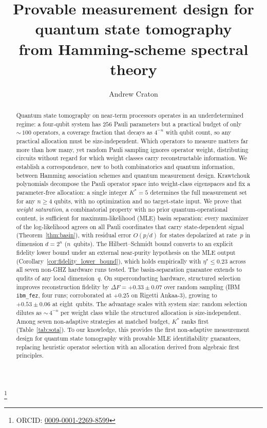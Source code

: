 \documentclass[twocolumn,prx,aps,superscriptaddress,longbibliography,floatfix]{revtex4-2}
\newcommand{\pclaim}[4]{}
\begin{document}
\title{Provable measurement design for quantum state tomography\\
from Hamming-scheme spectral theory}

\author{Andrew Craton}
\thanks{ORCID: \href{https://orcid.org/0009-0001-2269-8599}{0009-0001-2269-8599}}

\begin{abstract}
Quantum state tomography on near-term processors operates in an
underdetermined regime: a four-qubit system has $256$ Pauli
parameters but a practical budget of only ${\sim}\,100$
operators, a coverage fraction that decays as $4^{-n}$ with
qubit count, so any practical allocation must be
size-independent.
Which operators to measure matters far more than how many, yet
random Pauli sampling ignores operator weight, distributing
circuits without regard for which weight classes carry
reconstructable information.
%
We establish a correspondence, new to both combinatorics and
quantum information, between Hamming association schemes and
quantum measurement design.
\pclaim{prose:abstract:basin}{proved}{*}{thm:basin}%
Krawtchouk polynomials decompose the Pauli operator space into
weight-class eigenspaces and fix a parameter-free allocation:
a single integer $K^* = 5$ determines the full measurement
set for any $n \ge 4$ qubits, with no optimization and no
target-state input.
We prove that \emph{weight saturation}, a combinatorial
property with no prior quantum-operational content, is
sufficient for maximum-likelihood (MLE) basin separation:
every maximizer of the log-likelihood agrees on all
Pauli coordinates that carry state-dependent signal
(Theorem~\ref{thm:basin}),
with residual error $O(p/d)$ for states depolarized at
rate~$p$ in dimension $d = 2^n$ ($n$~qubits).
The Hilbert--Schmidt bound converts to an explicit fidelity
lower bound under an external near-purity hypothesis on the
MLE output (Corollary~\ref{cor:fidelity_lower_bound}), which
holds empirically with $\eta^{\star} \le 0.23$ across all
seven non-GHZ hardware runs tested.
The basin-separation guarantee extends to qudits of any local dimension~$q$.
\pclaim{prose:abstract:iff}{proved}{*}{lem:spectral_q_main}%
%
On superconducting hardware, structured selection improves
reconstruction fidelity by $\Delta F = +0.33 \pm 0.07$ over
random sampling (IBM \texttt{ibm\_fez}, four runs; corroborated
at $+0.25$ on Rigetti Ankaa-3), growing to
$+0.53 \pm 0.06$ at eight~qubits.
The advantage scales with system size: random selection
dilutes as ${\sim}\,4^{-n}$ per weight class while the
structured allocation is size-independent.
Among seven non-adaptive strategies at matched budget, $K^*$
ranks first (Table~\ref{tab:sota}).
To our knowledge, this provides the first non-adaptive
measurement design for quantum state tomography with provable
MLE identifiability guarantees, replacing heuristic operator
selection with an allocation derived from algebraic first
principles.
\end{abstract}
\end{document}
